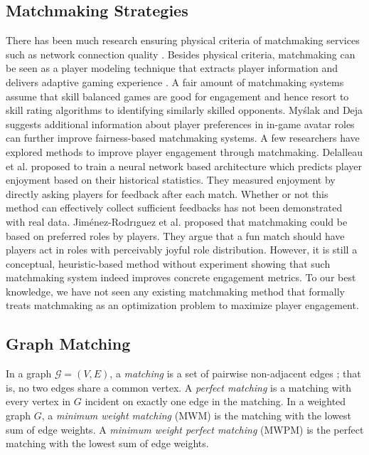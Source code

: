\subsection{Matchmaking Strategies}
There has been much research ensuring physical criteria of matchmaking services such as network connection quality \cite{agarwal2009matchmaking,lee2008measurement,manweiler2011switchboard}. Besides physical criteria, matchmaking can be seen as a player modeling technique \cite{Yannakakis2013} that extracts player information and delivers adaptive gaming experience \cite{chen2015analytics}. A fair amount of matchmaking systems assume that skill balanced games are good for engagement \cite{graepel2006ranking} and hence resort to skill rating algorithms to identifying similarly skilled opponents. My\'{s}lak and Deja \cite{myslak2014developing} suggests additional information about player preferences in in-game avatar roles can further improve fairness-based matchmaking systems. A few researchers have explored methods to improve player engagement through matchmaking. Delalleau et al. \cite{Delalleau2012} proposed to train a neural network based architecture which predicts player enjoyment based on their historical statistics. They measured enjoyment by directly asking players for feedback after each match. Whether or not this method can effectively collect sufficient feedbacks has not been demonstrated with real data. Jim{\'e}nez-Rodr{\i}guez et al. \cite{jimenez2011matchmaking} proposed that matchmaking could be based on preferred roles by players. They argue that a fun match should have players act in  roles with perceivably joyful role distribution. However, it is still a conceptual, heuristic-based method without experiment showing that such matchmaking system indeed improves concrete engagement metrics. To our best knowledge, we have not seen any existing matchmaking method that formally treats matchmaking as an optimization problem to maximize player engagement.



\subsection{Graph Matching}
In a graph $\mathcal{G}=(V, E)$, a \textit{matching} is a set of pairwise non-adjacent edges \cite{west2001introduction}; that is, no two edges share a common vertex. A \textit{perfect matching} is a matching with every vertex in $G$ incident on exactly one edge in the matching.  In a weighted graph $G$, a \textit{minimum weight matching } (MWM) is the matching with the lowest sum of edge weights. A \textit{minimum weight perfect matching} (MWPM) is the perfect matching with the lowest sum of edge weights.


